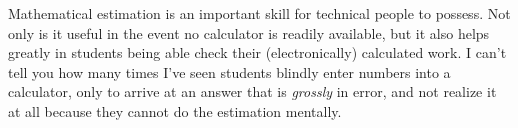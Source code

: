 Mathematical estimation is an important skill for technical people to possess.  Not only is it useful in the event no calculator is readily available, but it also helps greatly in students being able check their (electronically) calculated work.  I can't tell you how many times I've seen students blindly enter numbers into a calculator, only to arrive at an answer that is {\it grossly} in error, and not realize it at all because they cannot do the estimation mentally.





